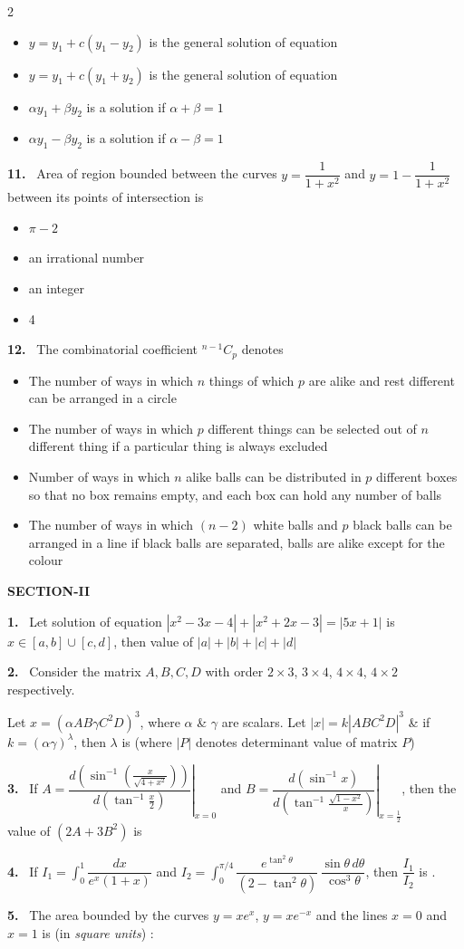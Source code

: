 \documentclass[10pt]{extarticle}
\newcommand{\sect}[1]{\par\smallskip\noindent\textbf{#1}\par}
\newcommand{\qn}[1]{\par\smallskip\noindent\textbf{#1.}~}
\newenvironment{qoptions}{\begin{itemize}[leftmargin=1.8em,itemsep=1pt,topsep=2pt,label={}]}{\end{itemize}}
\newcommand{\opt}[2]{\item[(#1)] #2}
\begin{document}
\begin{multicols}{2}
\begin{qoptions}
\opt{A}{$y=y_1+c(y_1-y_2)$ is the general solution of equation}
\opt{B}{$y=y_1+c(y_1+y_2)$ is the general solution of equation}
\opt{C}{$\alpha y_1+\beta y_2$ is a solution if $\alpha+\beta=1$}
\opt{D}{$\alpha y_1-\beta y_2$ is a solution if $\alpha-\beta=1$}
\end{qoptions}
\qn{11} Area of region bounded between the curves $y=\dfrac1{1+x^2}$ and $y=1-\dfrac1{1+x^2}$ between its points of intersection is
\begin{qoptions}
\opt{A}{$\pi-2$}
\opt{B}{an irrational number}
\opt{C}{an integer}
\opt{D}{4}
\end{qoptions}
\qn{12} The combinatorial coefficient $^{n-1}C_p$ denotes
\begin{qoptions}
\opt{A}{The number of ways in which $n$ things of which $p$ are alike and rest different can be arranged in a circle}
\opt{B}{The number of ways in which $p$ different things can be selected out of $n$ different thing if a particular thing is always excluded}
\opt{C}{Number of ways in which $n$ alike balls can be distributed in $p$ different boxes so that no box remains empty, and each box can hold any number of balls}
\opt{D}{The number of ways in which $(n-2)$ white balls and $p$ black balls can be arranged in a line if black balls are separated, balls are alike except for the colour}
\end{qoptions}
\sect{SECTION-II}
\qn{1} Let solution of equation $|x^2-3x-4|+|x^2+2x-3|=|5x+1|$ is $x\in[a,b]\cup[c,d]$, then value of $|a|+|b|+|c|+|d|$
\qn{2} Consider the matrix $A,B,C,D$ with order $2\times3$, $3\times4$, $4\times4$, $4\times2$ respectively.\par
Let $x=(\alpha AB\gamma C^2D)^3$, where $\alpha$ \& $\gamma$ are scalars. Let $|x|=k|ABC^2D|^3$ \& if $k=(\alpha\gamma)^\lambda$, then $\lambda$ is (where $|P|$ denotes determinant value of matrix $P$)
\qn{3} If $A=\left.\dfrac{d\left(\sin^{-1}\left(\frac{x}{\sqrt{4+x^2}}\right)\right)}{d\left(\tan^{-1}\frac x2\right)}\right|_{x=0}$ and $B=\left.\dfrac{d\left(\sin^{-1}x\right)}{d\left(\tan^{-1}\frac{\sqrt{1-x^2}}{x}\right)}\right|_{x=\frac12}$, then the value of $(2A+3B^2)$ is
\qn{4} If $I_1=\displaystyle\int_0^1\dfrac{dx}{e^x(1+x)}$ and $I_2=\displaystyle\int_0^{\pi/4}\dfrac{e^{\tan^2\theta}}{(2-\tan^2\theta)}\,\dfrac{\sin\theta\,d\theta}{\cos^3\theta}$, then $\dfrac{I_1}{I_2}$ is \underline{\hspace{2cm}}.
\qn{5} The area bounded by the curves $y=xe^x$, $y=xe^{-x}$ and the lines $x=0$ and $x=1$ is (in \textit{square units}) :

\end{multicols}
\end{document}
